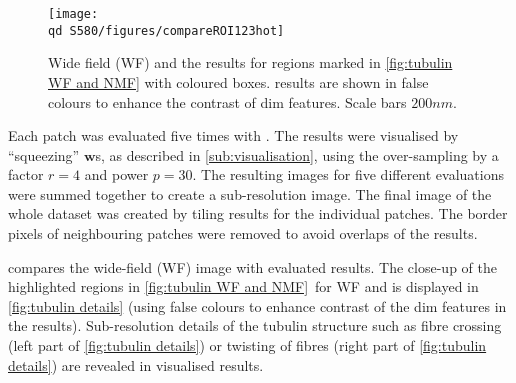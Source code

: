 \begin{figure}[!hb]
	\centering
	\texttt{[image: \\qd S580/figures/compareROI123hot]}
	\caption{Wide field (WF) and the \inmf{} results for regions marked in \autoref{fig:tubulin WF and NMF} with coloured boxes. \inmf{} results are shown in false colours to enhance the contrast of dim features. Scale bars $200 \unit{nm}$.} 
	\label{fig:tubulin details}
\end{figure}
% 
Each patch was evaluated five times with \inmf{}. The results were visualised by ``squeezing'' $\bm{w}$s, as described in \autoref{sub:visualisation}, using the over-sampling by a factor $r=4$ and power $p=30$. The resulting images for five different \inmf{} evaluations were summed together to create a sub-resolution image. The final image of the whole dataset was created by tiling results for the individual patches. The border pixels of neighbouring patches were removed to avoid overlaps of the results.

 compares the wide-field (WF) image with \inmf{} evaluated results. The close-up of the highlighted regions in \autoref{fig:tubulin WF and NMF}\aaa\ for WF and \inmf{} is displayed in \autoref{fig:tubulin details} (using false colours to enhance contrast of the dim features in the \inmf{} results). Sub-resolution details of the tubulin structure such as fibre crossing (left part of \autoref{fig:tubulin details}) or twisting of fibres (right part of \autoref{fig:tubulin details}) are revealed in visualised \inmf{} results.



